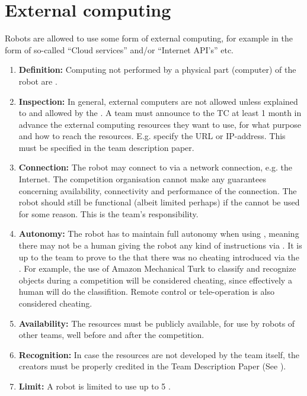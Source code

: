 \section{External computing}\label{rule:robot_external_computing}
Robots are allowed to use some form of external computing, for example in the form of so-called ``Cloud services'' and/or ``Internet API's'' etc. 
\begin{enumerate}
	\item \textbf{Definition:} Computing not performed by a physical part (computer) of the robot are . 
	\item \textbf{Inspection:} In general, external computers are not allowed unless explained to and allowed by the .
	  A team must announce to the TC at least 1 month in advance the external computing resources they want to use, for what purpose and how to reach the resources.
	  E.g. specify the URL or IP-address. 
	  This must be specified in the team description paper. 
	\item \textbf{Connection:} The robot may connect to  via a network connection, e.g. the Internet. 
	  The competition organisation cannot make any guarantees concerning availability, connectivity and performance of the connection. 
	  The robot should still be functional (albeit limited perhaps) if the  cannot be used for some reason.
	  This is the team's responsibility. 
	\item \textbf{Autonomy:} The robot has to maintain full autonomy when using , 
	  meaning there may not be a human giving the robot any kind of instructions via .
	  It is up to the team to prove to the  that there was no cheating introduced via the . 
	  For example, the use of Amazon Mechanical Turk to classify and recognize objects during a competition will be considered cheating, since effectively a human will do the classifition. 
	  Remote control or tele-operation is also considered cheating. 
	\item \textbf{Availability:} The resources must be publicly available, for use by robots of other teams, well before and after the competition.
	\item \textbf{Recognition:} In case the resources are not developed by the team itself, the creators must be properly credited in the Team Description Paper (See ).
	\item \textbf{Limit:} A robot is limited to use up to 5 . 
\end{enumerate}


 
